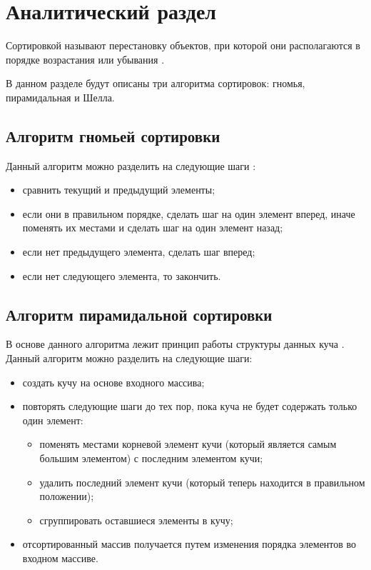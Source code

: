 \chapter{Аналитический раздел}

Сортировкой называют перестановку объектов, при которой они располагаются в порядке возрастания или убывания \cite{knut}.

В данном разделе будут описаны три алгоритма сортировок: гномья, пирамидальная и Шелла.

\section{Алгоритм гномьей сортировки}
Данный алгоритм можно разделить на следующие шаги \cite{gnome}:

\begin{itemize}
	\item сравнить текущий и предыдущий элементы;
	\item если они в правильном порядке, сделать шаг на один элемент вперед, иначе поменять их местами и сделать шаг на один элемент назад;
	\item если нет предыдущего элемента, сделать шаг вперед;
	\item если нет следующего элемента, то закончить.
\end{itemize}


\section{Алгоритм пирамидальной сортировки}

В основе данного алгоритма лежит принцип работы структуры данных куча \cite{heap}.
Данный алгоритм можно разделить на следующие шаги:

\begin{itemize}
	\item создать кучу на основе входного массива;
	\item повторять следующие шаги до тех пор, пока куча не будет содержать только один элемент:
	\begin{itemize}
		\item поменять местами корневой элемент кучи (который является самым большим элементом) с последним элементом кучи;
		\item удалить последний элемент кучи (который теперь находится в правильном положении);
		\item сгруппировать оставшиеся элементы в кучу;
	\end{itemize}
	\item отсортированный массив получается путем изменения порядка элементов во входном массиве.
\end{itemize}


